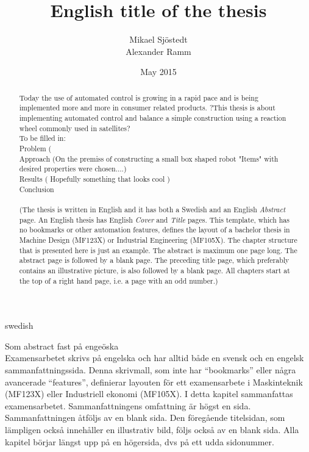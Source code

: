 \documentclass[a4paper,11pt]{kth-mag}
\title{English title of the thesis}
\author{Mikael Sjöstedt \\ Alexander Ramm}
\date{May 2015}
\begin{document}
%
\clearpage

\frontmatter
\pagestyle{plain}
{}
\maketitle
{}
\begin{abstract}
Today the use of automated control is growing in a rapid pace and is being implemented more and more in consumer related products. ?This thesis is about implementing automated control and balance a simple construction using a reaction wheel commonly used in satellites? 
\\ To be filled in:
\\Problem ( 
\\Approach (On the premiss of constructing a small box shaped robot "Items" with desired properties were chosen....)
\\Results ( Hopefully something that looks cool ) 
\\ Conclusion
\\ \\
(The thesis is written in English and it has both a Swedish and an English \textit{Abstract} page. An English thesis has English \textit{Cover} and \textit{Title} pages. This template, which has no bookmarks or other automation features, defines the layout of a bachelor thesis in Machine Design (MF123X) or Industrial Engineering (MF105X).  The chapter structure that is presented here is just an example.
The abstract is maximum one page long. The abstract page is followed by a blank page. The preceding title page, which preferably contains an illustrative picture, is also followed by a blank page. All chapters start at the top of a right hand page, i.e. a page with an odd number.)
\end{abstract}
\cleardoublepage
\begin{foreignabstract}{swedish}
Som abstract fast på engeöska
\\
Examensarbetet skrivs på engelska och har alltid både en svensk och en engelsk sammanfattningssida. Denna skrivmall, som inte har ``bookmarks'' eller några avancerade ``features'', definierar layouten för ett examensarbete i Maskinteknik (MF123X) eller Industriell ekonomi (MF105X).
I detta kapitel sammanfattas examensarbetet. Sammanfattningens omfattning är högst en sida. Sammanfattningen åtföljs av en blank sida. Den föregående titelsidan, som lämpligen också innehåller en illustrativ bild, följs också av en blank sida. Alla kapitel börjar längst upp på en högersida, dvs på ett udda sidonummer.
\end{foreignabstract}
\clearpage
\end{document}
